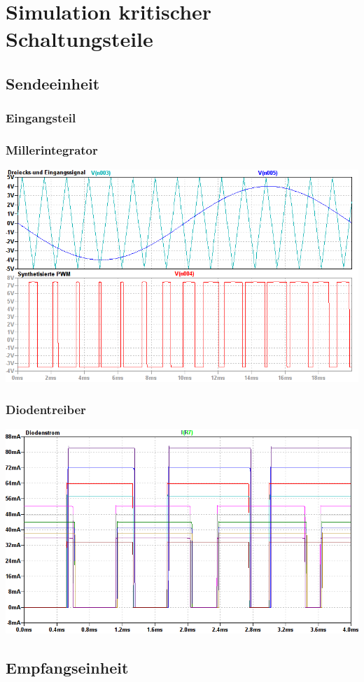 \section{Simulation kritischer Schaltungsteile}
\subsection{Sendeeinheit}
\subsubsection{Eingangsteil}
\subsubsection{Millerintegrator}
\begin{float}
\centering
\includegraphics[scale=0.5]{gfx/simTx/PWMsynth.png}
\end{float}
\subsubsection{Diodentreiber}
\includegraphics[scale=0.5]{gfx/simTx/DiodeCurrent.png}
\subsection{Empfangseinheit}